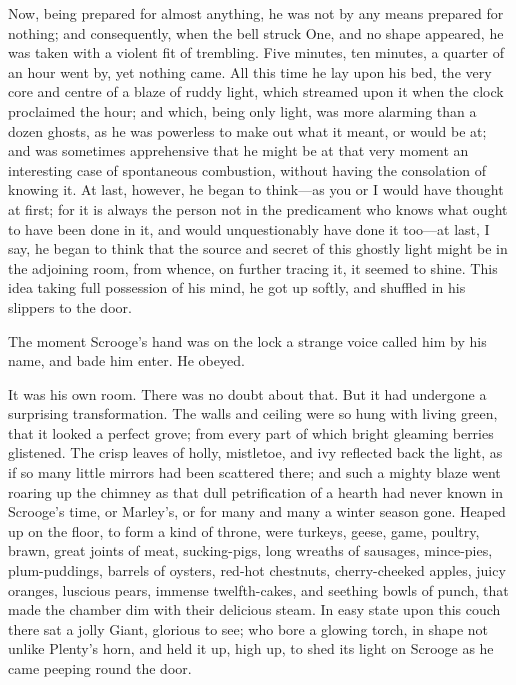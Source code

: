 \documentclass[paper=a5,BCOR=15mm,twoside,DIV=15,headinclude=off,12pt,chapterprefix=off,openany,headings=huge]{scrbook} %
\begin{document}
Now, being prepared for almost anything, he was not by any means prepared for nothing; and consequently, when the bell struck One, and no shape appeared, he was taken with a violent fit of trembling. Five minutes, ten minutes, a quarter of an hour went by, yet nothing came. All this time he lay upon his bed, the very core and centre of a blaze of ruddy light, which streamed upon it when the clock proclaimed the hour; and which, being only light, was more alarming than a dozen ghosts, as he was powerless to make out what it meant, or would be at; and was sometimes apprehensive that he might be at that very moment an interesting case of spontaneous combustion, without having the consolation of knowing it. At last, however, he began to think—as you or I would have thought at first; for it is always the person not in the predicament who knows what ought to have been done in it, and would unquestionably have done it too—at last, I say, he began to think that the source and secret of this ghostly light might be in the adjoining room, from whence, on further tracing it, it seemed to shine. This idea taking full possession of his mind, he got up softly, and shuffled in his slippers to the door.

The moment Scrooge's hand was on the lock a strange voice called him by his name, and bade him enter. He obeyed.

It was his own room. There was no doubt about that. But it had undergone a surprising transformation. The walls and ceiling were so hung with living green, that it looked a perfect grove; from every part of which bright gleaming berries glistened. The crisp leaves of holly, mistletoe, and ivy reflected back the light, as if so many little mirrors had been scattered there; and such a mighty blaze went roaring up the chimney as that dull petrification of a hearth had never known in Scrooge's time, or Marley's, or for many and many a winter season gone. Heaped up on the floor, to form a kind of throne, were turkeys, geese, game, poultry, brawn, great joints of meat, sucking-pigs, long wreaths of sausages, mince-pies, plum-puddings, barrels of oysters, red-hot chestnuts, cherry-cheeked apples, juicy oranges, luscious pears, immense twelfth-cakes, and seething bowls of punch, that made the chamber dim with their delicious steam. In easy state upon this couch there sat a jolly Giant, glorious to see; who bore a glowing torch, in shape not unlike Plenty's horn, and held it up, high up, to shed its light on Scrooge as he came peeping round the door.
\end{document}
